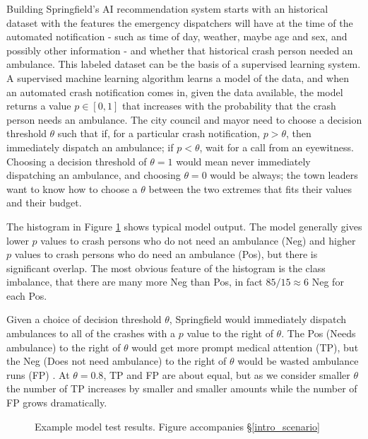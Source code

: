 Building Springfield's AI recommendation system starts with an historical dataset with the features the emergency dispatchers will have at the time of the automated notification - such as time of day, weather, maybe age and sex, and possibly other information - and whether that historical crash person needed an ambulance.  This labeled dataset can be the basis of a supervised learning system.  A supervised machine learning algorithm learns a model of the data, and when an automated crash notification comes in, given the data available, the model returns a value $p \in [0,1]$ that increases with the probability that the crash person needs an ambulance.  The city council and mayor need to choose a decision threshold $\theta$ such that if, for a particular crash notification, $p>\theta$, then immediately dispatch an ambulance; if $p<\theta$, wait for a call from an eyewitness.  Choosing a decision threshold of $\theta=1$ would mean never immediately dispatching an ambulance, and choosing $\theta=0$ would be always; the town leaders want to know how to choose a $\theta$ between the two extremes that fits their values and their budget.

The histogram in Figure \ref{intro_ideal} shows typical model output.  The model generally gives lower $p$ values to crash persons who do not need an ambulance (Neg) and higher $p$ values to crash persons who do need an ambulance (Pos), but there is significant overlap.  The most obvious feature of the histogram is the class imbalance, that there are many more Neg than Pos, in fact $85/15 \approx 6$ Neg for each Pos.  

Given a choice of decision threshold $\theta$, Springfield would immediately dispatch ambulances to all of the crashes with a $p$ value to the right of $\theta$.  The Pos (Needs ambulance) to the right of $\theta$ would get more prompt medical attention (TP), but the Neg (Does not need ambulance) to the right of $\theta$ would be wasted ambulance runs (FP) .  At $\theta = 0.8$, TP and FP are about equal, but as we consider smaller $\theta$ the number of TP increases by smaller and smaller amounts while the number of FP grows dramatically.  

\begin{figure}[h]
\centering
	
\caption{\normalfont\normalsize Example model test results.  Figure accompanies \S\ref{intro_scenario}}
\label{intro_ideal}
\end{figure}

\FloatBarrier

